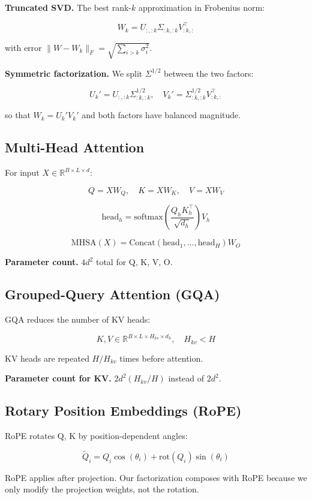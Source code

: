 \textbf{Truncated SVD.} The best rank-$k$ approximation in Frobenius norm:

\[
W_k = U_{:, :k} \Sigma_{:k, :k} V_{:k, :}^\top
\]

with error $\|W - W_k\|_F = \sqrt{\sum_{i > k} \sigma_i^2}$.

\textbf{Symmetric factorization.} We split $\Sigma^{1/2}$ between the two factors:

\[
U_k' = U_{:, :k} \Sigma_{:k, :k}^{1/2}, \quad
V_k' = \Sigma_{:k, :k}^{1/2} V_{:k, :}^\top
\]

so that $W_k = U_k' V_k'$ and both factors have balanced magnitude.

\subsection{Multi-Head Attention}

For input $X \in \mathbb{R}^{B \times L \times d}$:

\[
Q = X W_Q, \quad K = X W_K, \quad V = X W_V
\]

\[
\text{head}_h = \text{softmax}\!\left(\frac{Q_h K_h^\top}{\sqrt{d_h}}\right) V_h
\]

\[
\text{MHSA}(X) = \text{Concat}(\text{head}_1, \dots, \text{head}_H) W_O
\]

\textbf{Parameter count.} $4 d^2$ total for Q, K, V, O.

\subsection{Grouped-Query Attention (GQA)}

GQA reduces the number of KV heads:

\[
K, V \in \mathbb{R}^{B \times L \times H_{kv} \times d_h}, \quad
H_{kv} < H
\]

KV heads are repeated $H / H_{kv}$ times before attention.

\textbf{Parameter count for KV.} $2 d^2 (H_{kv} / H)$ instead of $2 d^2$.

\subsection{Rotary Position Embeddings (RoPE)}

RoPE rotates Q, K by position-dependent angles:

\[
\tilde{Q}_i = Q_i \cos(\theta_i) + \text{rot}(Q_i) \sin(\theta_i)
\]

RoPE applies after projection. Our factorization composes with RoPE because 
we only modify the projection weights, not the rotation.

